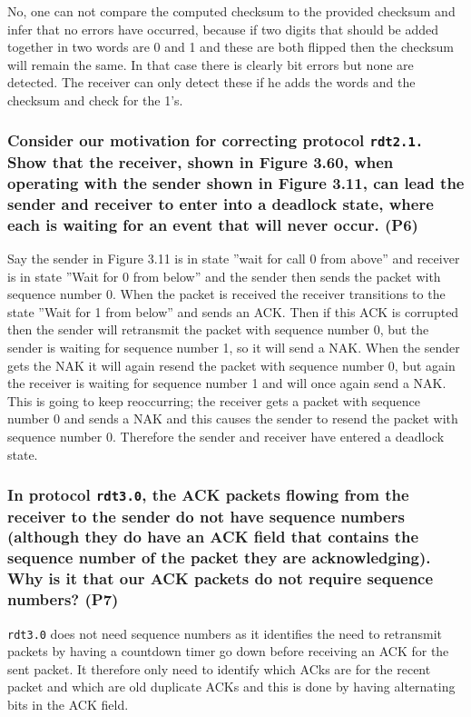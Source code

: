 No, one can not compare the computed checksum to the provided checksum and infer that no errors have occurred, because if two digits that should be added together in two words are 0 and 1 and these are both flipped then the checksum will remain the same. In that case there is clearly bit errors but none are detected. The receiver can only detect these if he adds the words and the checksum and check for the 1's.


\subsubsection{Consider our motivation for correcting protocol \texttt{rdt2.1.} Show that the receiver, shown in Figure 3.60, when operating with the sender shown in Figure 3.11, can lead the sender and receiver to enter into a deadlock state, where each is waiting for an event that will never occur. (P6)}
\label{sec:kr_3.9.6}

Say the sender in Figure 3.11 is in state ''wait for call 0 from above'' and receiver is in state ''Wait for 0 from below'' and the sender then sends the packet with sequence number 0. When the packet is received the receiver transitions to the state ''Wait for 1 from below'' and sends an ACK. Then if this ACK is corrupted then the sender will retransmit the packet with sequence number 0, but the sender is waiting for sequence number 1, so it will send a NAK. When the sender gets the NAK it will again resend the packet with sequence number 0, but again the receiver is waiting for sequence number 1 and will once again send a NAK. This is going to keep reoccurring; the receiver gets a packet with sequence number 0 and sends a NAK and this causes the sender to resend the packet with sequence number 0. Therefore the sender and receiver have entered a deadlock state.


\subsubsection{In protocol \texttt{rdt3.0}, the ACK packets flowing from the receiver to the sender do not have sequence numbers (although they do have an ACK field that contains the sequence number of the packet they are acknowledging). Why is it that our ACK packets do not require sequence numbers? (P7)}

\texttt{rdt3.0} does not need sequence numbers as it identifies the need to retransmit packets by having a countdown timer go down before receiving an ACK for the sent packet. It therefore only need to identify which ACks are for the recent packet and which are old duplicate ACKs and this is done by having alternating bits in the ACK field.


